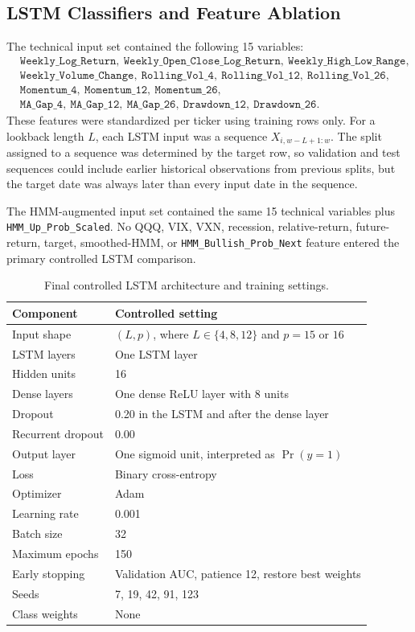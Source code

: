 \subsection{LSTM Classifiers and Feature Ablation}

The technical input set contained the following 15 variables:
\[
\begin{aligned}
&\texttt{Weekly\_Log\_Return},\ \texttt{Weekly\_Open\_Close\_Log\_Return},\ \texttt{Weekly\_High\_Low\_Range},\\
&\texttt{Weekly\_Volume\_Change},\ \texttt{Rolling\_Vol\_4},\ \texttt{Rolling\_Vol\_12},\ \texttt{Rolling\_Vol\_26},\\
&\texttt{Momentum\_4},\ \texttt{Momentum\_12},\ \texttt{Momentum\_26},\\
&\texttt{MA\_Gap\_4},\ \texttt{MA\_Gap\_12},\ \texttt{MA\_Gap\_26},\ \texttt{Drawdown\_12},\ \texttt{Drawdown\_26}.
\end{aligned}
\]
These features were standardized per ticker using training rows only. For a lookback length \(L\), each LSTM input was a sequence \(X_{i,w-L+1:w}\). The split assigned to a sequence was determined by the target row, so validation and test sequences could include earlier historical observations from previous splits, but the target date was always later than every input date in the sequence.

The HMM-augmented input set contained the same 15 technical variables plus \texttt{HMM\_Up\_Prob\_Scaled}. No QQQ, VIX, VXN, recession, relative-return, future-return, target, smoothed-HMM, or \texttt{HMM\_Bullish\_Prob\_Next} feature entered the primary controlled LSTM comparison.

\begin{table}[H]
\centering
\caption{Final controlled LSTM architecture and training settings.}
\label{tab:method-lstm-architecture}
\small
\begin{tabular}{ll}
\toprule
Component & Controlled setting \\
\midrule
Input shape & \((L,p)\), where \(L\in\{4,8,12\}\) and \(p=15\) or \(16\) \\
LSTM layers & One LSTM layer \\
Hidden units & 16 \\
Dense layers & One dense ReLU layer with 8 units \\
Dropout & 0.20 in the LSTM and after the dense layer \\
Recurrent dropout & 0.00 \\
Output layer & One sigmoid unit, interpreted as \(\Pr(y=1)\) \\
Loss & Binary cross-entropy \\
Optimizer & Adam \\
Learning rate & 0.001 \\
Batch size & 32 \\
Maximum epochs & 150 \\
Early stopping & Validation AUC, patience 12, restore best weights \\
Seeds & 7, 19, 42, 91, 123 \\
Class weights & None \\
\bottomrule
\end{tabular}
\end{table}

